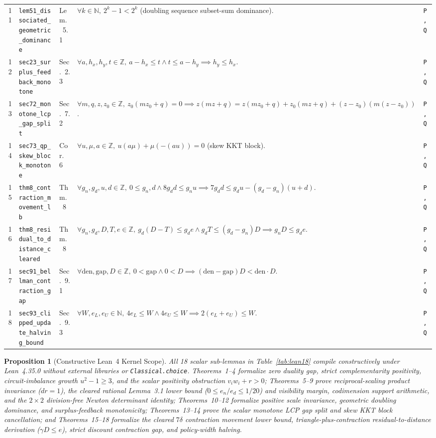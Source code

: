 \documentclass[10pt,twocolumn]{article}
\newtheorem{proposition}{Proposition}
\newcommand{\ZZ}{\mathbb{Z}}
\newcommand{\NN}{\mathbb{N}}
\begin{document}
\begin{table}[t]
\begin{tabular}{@{}r l l p{9.6cm} l@{}}
11 & \texttt{lem51\_dissociated\_geometric\_dominance} & Lem.~5.1 & $\forall k\in\NN,\ 2^k - 1 < 2^k$ (doubling sequence subset-sum dominance). & \texttt{P,Q} \\
12 & \texttt{sec23\_surplus\_feedback\_monotone} & Sec.~2.3 & $\forall a,h_x,h_y,t\in\ZZ,\ a-h_x\le t \wedge t\le a-h_y \implies h_y\le h_x$. & \texttt{P,Q} \\
13 & \texttt{sec72\_monotone\_lcp\_gap\_split} & Sec.~7.2 & $\forall m,q,z,z_0\in\ZZ,\ z_0(mz_0+q)=0 \implies z(mz+q)=z(mz_0+q)+z_0(mz+q)+(z-z_0)(m(z-z_0))$. & \texttt{P,Q} \\
14 & \texttt{sec73\_qp\_skew\_block\_monotone} & Cor.~6 & $\forall u,\mu,a\in\ZZ,\ u(a\mu)+\mu(-(au))=0$ (skew KKT block). & \texttt{P,Q} \\
15 & \texttt{thm8\_contraction\_movement\_lb} & Thm.~8 & $\forall g_n,g_d,u,d\in\ZZ,\ 0\le g_n,d \wedge 8g_dd\le g_nu \implies 7g_dd\le g_du-(g_d-g_n)(u+d)$. & \texttt{P,Q} \\
16 & \texttt{thm8\_residual\_to\_distance\_cleared} & Thm.~8 & $\forall g_n,g_d,D,T,e\in\ZZ,\ g_d(D-T)\le g_de \wedge g_dT\le (g_d-g_n)D \implies g_nD\le g_de$. & \texttt{P,Q} \\
17 & \texttt{sec91\_bellman\_contraction\_gap} & Sec.~9.1 & $\forall \mathrm{den},\mathrm{gap},D\in\ZZ,\ 0<\mathrm{gap} \wedge 0<D \implies (\mathrm{den}-\mathrm{gap})D < \mathrm{den}\cdot D$. & \texttt{P,Q} \\
18 & \texttt{sec93\_clipped\_update\_halving\_bound} & Sec.~9.3 & $\forall W,e_L,e_U\in\NN,\ 4e_L\le W \wedge 4e_U\le W \implies 2(e_L+e_U)\le W$. & \texttt{P,Q} \\
\bottomrule
\end{tabular}
\end{table}

\begin{proposition}[Constructive Lean~4 Kernel Scope]\label{prop:lean}
\normalfont All 18 scalar sub-lemmas in Table~\ref{tab:lean18} compile constructively under Lean~4.35.0 without external libraries or \texttt{Classical.choice}. Theorems~1--4 formalize zero duality gap, strict complementarity positivity, circuit-imbalance growth $u^2-1\ge 3$, and the scalar positivity obstruction $v_i w_i + r > 0$; Theorems~5--9 prove reciprocal-scaling product invariance ($dr=1$), the cleared rational Lemma~3.1 lower bound ($0\le e_n/e_d\le 1/20$) and visibility margin, codimension support arithmetic, and the $2\times 2$ division-free Newton determinant identity; Theorems~10--12 formalize positive scale invariance, geometric doubling dominance, and surplus-feedback monotonicity; Theorems~13--14 prove the scalar monotone LCP gap split and skew KKT block cancellation; and Theorems~15--18 formalize the cleared $7\delta$ contraction movement lower bound, triangle-plus-contraction residual-to-distance derivation ($\gamma D\le e$), strict discount contraction gap, and policy-width halving.
\end{proposition}
\end{document}
